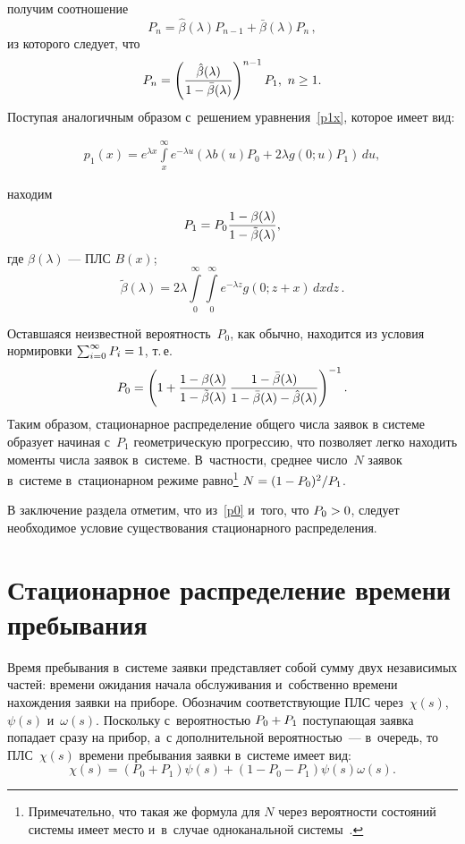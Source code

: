 \begin{multicols}{2}
\noindent 
получим соотношение 
$$
P_{n}={\hat \beta}(\lambda)
P_{n-1} + {\bar \beta}(\lambda) P_{n}\,, 
$$
из которого следует, что 
\begin{equation*}
\label{pn}
P_{n}
=
\left (
\displaystyle\frac{\displaystyle 
{\hat \beta}(\lambda)\mathstrut}{\displaystyle 1- {\bar \beta}(\lambda)\mathstrut}
\right )^{n-1} P_1, \ n\geq 1.
\end{equation*}
\noindent Поступая аналогичным образом с~решением уравнения~\eqref{p1x},
которое имеет вид: 

\noindent
\begin{eqnarray*}
\label{p1xsol}
p_{1}(x) = 
e^{\lambda x}
\int\limits_{x}^{\infty}
e^{-\lambda u}
(\lambda b(u) P_0 + 2 \lambda g(0;u) P_1)\,du,
\end{eqnarray*}

\noindent
находим 
$$
P_1=P_0\displaystyle\frac{\displaystyle 1 - \beta(\lambda)\mathstrut}{\displaystyle 1 - {\tilde \beta}(\lambda)\mathstrut},
$$
где $\beta(\lambda)$ --- ПЛС $B(x)$;
$$
{\tilde \beta}(\lambda)=
2 \lambda \int\limits_{0}^{\infty}
\int\limits_{0}^{\infty}
e^{-\lambda z}
g(0;z+x) \,dx dz\,.
$$

Оставшаяся неизвестной вероятность~$P_0$, как обычно, находится из 
условия нормировки 
$\sum\nolimits_{i=0}^\infty P_i\hm=1$, т.\,е.
\begin{eqnarray}
\label{p0}
P_0=
\left (1+
\displaystyle\frac{\displaystyle 1 - \beta(\lambda) \mathstrut}{\displaystyle 1 - {\tilde \beta}(\lambda)\mathstrut}\,
\displaystyle\frac{\displaystyle 1- {\bar \beta}(\lambda)
\mathstrut}{\displaystyle 1- {\bar \beta}(\lambda)-{\hat \beta}(\lambda)\mathstrut}
\right )^{-1}.
\end{eqnarray}
\noindent
Таким образом, стационарное распределение общего числа заявок
в системе образует начиная с~$P_1$ геометрическую прогрессию,
что позволяет легко находить моменты числа заявок в~системе. 
В~частности, среднее число~$N$ заявок в~системе в~стационарном режиме
равно\footnote{Примечательно, что такая же формула для $N$ 
через вероятности состояний системы имеет место и~в~случае одноканальной 
системы~\cite[Remark~3]{xx2}.} $N\hm=(1-P_0)^2/P_1$. 

В заключение раздела отметим, что из~\eqref{p0} и~того, что $P_0\hm>0$, 
следует необходимое условие существования стационарного распределения.


\section{Стационарное распределение времени пребывания}

Время пребывания в~системе заявки пред\-став\-ля\-ет собой сумму двух 
независимых частей: 
времени ожидания начала обслуживания и~собственно времени нахождения
заявки на приборе. 
Обозначим соответствующие ПЛС через~$\chi(s)$, $\psi(s)$ и~$\omega(s)$.
Поскольку с~вероятностью $P_0\hm+P_1$ поступающая заявка 
попадает сразу на прибор, а~с дополнительной вероятностью~--- в~очередь, 
то ПЛС~$\chi(s)$ времени пребывания заявки в~системе имеет вид:
\begin{equation}
\label{chi}
\chi(s)=
\left(P_0+P_1\right)\psi(s)+
\left(1-P_0-P_1\right)
\psi(s) \omega(s).
\end{equation}


\end{multicols}

